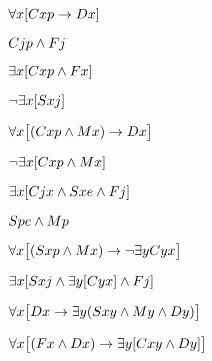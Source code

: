 \documentclass[PHIL101-Textbook.tex]{subfiles}
\begin{document}
%	
%	
	\begin{earg}
	\item %
	$\forall x[Cxp \rightarrow Dx]$
	\item %
	$Cjp \land Fj$
	\item %
	$\exists x[Cxp \land Fx]$
	\item %
	$\neg\exists x [Sxj]$
	\item %
	$\forall x\bigl[(Cxp \land Mx)\rightarrow Dx\bigr]$
	\item %
	$\neg\exists x[Cxp \land Mx]$
	\item %
	$\exists x[Cjx \land Sxe \land Fj]$
	\item %
	$Spe \land Mp$
	\item %
	$\forall x\bigl[(Sxp \land Mx) \rightarrow \neg\exists y Cyx\bigr]$
	\item %
	$\exists x[Sxj \land \exists y [Cyx] \land Fj]$
	\item %
	$\forall x\bigl[Dx \rightarrow \exists y(Sxy \land My \land Dy)\bigr]$
	\item %
	$\forall x\bigl[(Fx \land Dx) \rightarrow \exists y[Cxy \land Dy]\bigr]$
	\end{earg}
\end{document}
